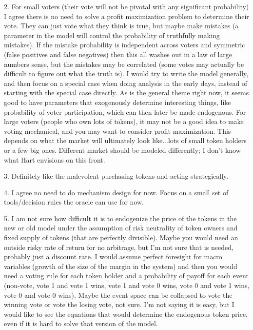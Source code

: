 \documentclass[12pt]{article}
\begin{document}
2. For small voters (their vote will not be pivotal with any significant probability) I agree there
is no need to solve a profit maximization problem to determine their vote. They can just vote what
they think is true, but maybe make mistakes (a parameter in the model will control the probability
of truthfully making mistakes). If the mistake probability is independent across voters and
symmetric (false positives and false negatives) then this all washes out in a law of large numbers
sense, but the mistakes may be correlated (some votes may actually be difficult to figure out what
the truth is). I would try to write the model generally, and then focus on a special case when doing
analysis in the early days, instead of starting with the special case directly. As is the general
theme right now, it seems good to have parameters that exogenously determine interesting things,
like probability of voter participation, which can then later be made endogenous. For large voters
(people who own lots of tokens), it may not be a good idea to make voting mechanical, and you may
want to consider profit maximization. This depends on what the market will ultimately look
like...lots of small token holders or a few big ones. Different market should be modeled
differently; I don't know what Hart envisions on this front.

3. Definitely like the malevolent purchasing tokens and acting strategically.

4. I agree no need to do mechanism design for now. Focus on a small set of tools/decision rules the
oracle can use for now.

5. I am not sure how difficult it is to endogenize the price of the tokens in the new or old model
under the assumption of risk neutrality of token owners and fixed supply of tokens (that are
perfectly divisible). Maybe you would need an outside risky rate of return for no arbitrage, but I'm
not sure that is needed, probably just a discount rate. I would assume perfect foresight for macro
variables (growth of the size of the margin in the system) and then you would need a voting rule for
each token holder and a probability of payoff for each event (non-vote, vote 1  and vote 1 wins,
vote 1 and vote 0 wins, vote 0 and vote 1 wins, vote 0 and vote 0 wins). Maybe the event space can
be collapsed to vote the winning vote or vote the losing vote, not sure. I'm not saying it is easy,
but I would like to see the equations that would determine the endogenous token price, even if it is
hard to solve that version of the model.
\end{document}
